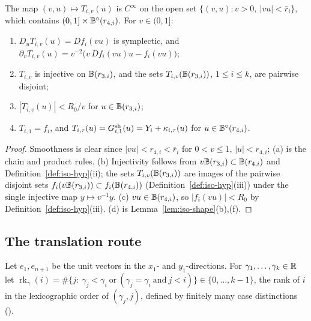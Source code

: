 \begin{lemma}\label{lem:iso-tail}
The map $(v,u)\mapsto T_{i,v}(u)$ is $C^\infty$ on the open set $\{(v,u):v>0,\ |vu|<\bar r_i\}$, which contains
$(0,1]\times\mathbb{B}^\circ(r_{4,i})$. For $v\in(0,1]$:
\begin{enumerate}[label=(\alph*)]
\item $D_uT_{i,v}(u)=Df_i(vu)$ is symplectic, and
 $\partial_vT_{i,v}(u)=v^{-2}\big(v\,Df_i(vu)u-f_i(vu)\big)$;
\item $T_{i,v}$ is injective on $\mathbb{B}(r_{3,i})$, and the sets $T_{i,v}(\mathbb{B}(r_{3,i}))$, $1\le i\le k$, are pairwise
 disjoint;
\item $|T_{i,v}(u)|<R_0/v$ for $u\in\mathbb{B}(r_{3,i})$;
\item $T_{i,1}=f_i$, and $T_{i,\tau}(u)=G^{\rm sh}_{i,1}(u)=Y_i+\kappa_{i,\tau}(u)$ for $u\in\mathbb{B}^\circ(r_{4,i})$.
\end{enumerate}
\end{lemma}

\begin{proof}
Smoothness is clear since $|vu|<r_{4,i}<\bar r_i$ for $0<v\le1$, $|u|<r_{4,i}$; (a) is the chain and product rules. (b) Injectivity follows from $v\mathbb{B}(r_{3,i})\subset\mathbb{B}(r_{4,i})$ and Definition~\ref{def:iso-hyp}(ii); the sets $T_{i,v}(\mathbb{B}(r_{3,i}))$ are images of the pairwise disjoint sets $f_i(v\mathbb{B}(r_{3,i}))\subset f_i(\mathbb{B}(r_{4,i}))$ (Definition~\ref{def:iso-hyp}(iii)) under the single injective map $y\mapsto v^{-1}y$. (c) $vu\in\mathbb{B}(r_{4,i})$, so $|f_i(vu)|<R_0$ by Definition~\ref{def:iso-hyp}(iii). (d) is Lemma~\ref{lem:iso-shape}(b),(f).
\end{proof}

\subsection{The translation route}\label{sec:iso-route}

Let $e_1,e_{n+1}$ be the unit vectors in the $x_1$- and $y_1$-directions. For $\gamma_1,\dots,\gamma_k\in\mathbb{R}$ let
$\operatorname{rk}_\gamma(i)=\#\{j:\ \gamma_j<\gamma_i\ \text{or}\ (\gamma_j=\gamma_i\ \text{and}\ j<i)\}\in\{0,\dots,k-1\}$,
the rank of $i$ in the lexicographic order of $(\gamma_j,j)$, defined by finitely many case distinctions ().

